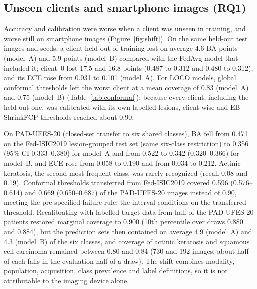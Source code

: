 
\subsection{Unseen clients and smartphone images (RQ1)}
\label{sec:res-shift}

Accuracy and calibration were worse when a client was unseen in training, and worse still on smartphone
images (Figure~\ref{fig:shift}). On the same held-out test images and seeds, a client held out of training
lost on average 4.6 BA points (model~A) and 5.9 points (model~B) compared with the FedAvg model that
included it; client~0 lost 17.5 and 16.8 points (0.487 to 0.312 and 0.480 to 0.312), and its ECE rose from
0.031 to 0.101 (model~A). For LOCO models, global conformal thresholds left the worst client at a mean
coverage of 0.83 (model~A) and 0.75 (model~B) (Table~\ref{tab:conformal}); because every client, including
the held-out one, was calibrated with its own labelled lesions, client-wise and EB-ShrinkFCP thresholds
reached about 0.90.

On PAD-UFES-20 (closed-set transfer to six shared classes), BA fell from 0.471 on the Fed-ISIC2019
lesion-grouped test set (same six-class restriction) to 0.356 (95\% CI 0.333--0.380) for model~A and from
0.522 to 0.342 (0.320--0.366) for model~B, and ECE rose from 0.058 to 0.190 and from 0.034 to 0.212.
Actinic keratosis, the second most frequent class, was rarely recognized (recall 0.08 and 0.19). Conformal
thresholds transferred from Fed-ISIC2019 covered 0.596 (0.576--0.614) and 0.669 (0.650--0.687) of the
PAD-UFES-20 images instead of 0.90, meeting the pre-specified failure rule; the interval conditions on the
transferred threshold. Recalibrating with labelled target data from half of the PAD-UFES-20 patients restored marginal coverage to
0.900 (10th percentile over draws 0.880 and 0.884), but the prediction sets then contained on average 4.9
(model~A) and 4.3 (model~B) of the six classes, and coverage of actinic keratosis and squamous cell
carcinoma remained between 0.80 and 0.84 (730 and 192 images; about half of each falls in the evaluation half of a draw). The shift combines modality, population, acquisition,
class prevalence and label definitions, so it is not attributable to the imaging device alone.


